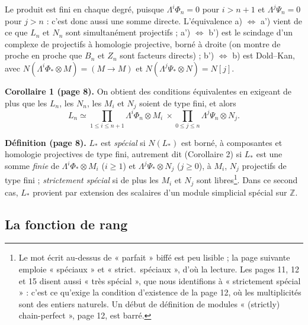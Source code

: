 \documentclass[11pt,a4paper]{article}
\begin{document}
Le produit est fini en chaque degré, puisque $\Lambda^{i}\Phi_{n} = 0$ pour
$i > n+1$ et $\Lambda^{j}\Psi_{n} = 0$ pour $j > n$ : c'est donc aussi une
somme directe. L'équivalence a) $\Leftrightarrow$ a') vient de ce que
$L_{n}$ et $N_{n}$ sont simultanément projectifs ; a') $\Leftrightarrow$ b')
est le scindage d'un complexe de projectifs à homologie projective, borné à
droite (on montre de proche en proche que $B_{n}$ et $Z_{n}$ sont facteurs
directs) ; b') $\Leftrightarrow$ b) est Dold–Kan, avec
$N(\Lambda^{i}\Phi_{*} \otimes M) = (M \to M)$ et
$N(\Lambda^{j}\Psi_{*} \otimes N) = N[j]$.

\textbf{Corollaire 1 (page 8).} On obtient des conditions équivalentes en
exigeant de plus que les $L_{n}$, les $N_{n}$, les $M_{i}$ et $N_{j}$ soient
de type fini, et alors
\[
  L_{n} \simeq \prod_{1 \leqslant i \leqslant n+1} \Lambda^{i}\Phi_{n}
  \otimes M_{i} \ \times \prod_{0 \leqslant j \leqslant n}
  \Lambda^{j}\Psi_{n} \otimes N_{j} .
\]

\textbf{Définition (page 8).} $L_{*}$ est \emph{spécial} si $N(L_{*})$ est
borné, à composantes et homologie projectives de type fini, autrement dit
(Corollaire 2) si $L_{*}$ est une somme \emph{finie} de
$\Lambda^{i}\Phi_{*} \otimes M_{i}$ ($i \geqslant 1$) et
$\Lambda^{j}\Psi_{*} \otimes N_{j}$ ($j \geqslant 0$), à $M_{i}$, $N_{j}$
projectifs de type fini ; \emph{strictement spécial} si de plus les $M_{i}$
et $N_{j}$ sont libres\footnote{Le mot écrit au-dessus de « parfait » biffé
est peu lisible ; la page suivante emploie « spéciaux » et « strict.\
spéciaux », d'où la lecture. Les pages 11, 12 et 15 disent aussi « très
spécial », que nous identifions à « strictement spécial » : c'est ce
qu'exige la condition d'existence de la page 12, où les multiplicités sont
des entiers naturels. Un début de définition de modules « (strictly)
chain-perfect », page 12, est barré.}. Dans ce second cas, $L_{*}$ provient
par extension des scalaires d'un module simplicial spécial sur $\mathbb{Z}$.

\subsection*{La fonction de rang}
\end{document}
